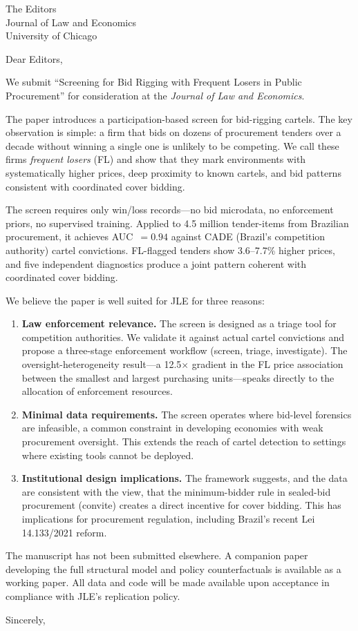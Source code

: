 \documentclass[12pt]{letter}
\date{April 2026}
\begin{document}
\begin{letter}{The Editors\\Journal of Law and Economics\\University of Chicago}

\opening{Dear Editors,}

We submit ``Screening for Bid Rigging with Frequent Losers in Public Procurement'' for consideration at the \textit{Journal of Law and Economics}.

The paper introduces a participation-based screen for bid-rigging cartels. The key observation is simple: a firm that bids on dozens of procurement tenders over a decade without winning a single one is unlikely to be competing. We call these firms \textit{frequent losers} (FL) and show that they mark environments with systematically higher prices, deep proximity to known cartels, and bid patterns consistent with coordinated cover bidding.

The screen requires only win/loss records---no bid microdata, no enforcement priors, no supervised training. Applied to 4.5 million tender-items from Brazilian procurement, it achieves AUC~$= 0.94$ against CADE (Brazil's competition authority) cartel convictions. FL-flagged tenders show 3.6--7.7\% higher prices, and five independent diagnostics produce a joint pattern coherent with coordinated cover bidding.

We believe the paper is well suited for JLE for three reasons:

\begin{enumerate}
\item \textbf{Law enforcement relevance.} The screen is designed as a triage tool for competition authorities. We validate it against actual cartel convictions and propose a three-stage enforcement workflow (screen, triage, investigate). The oversight-heterogeneity result---a 12.5$\times$ gradient in the FL price association between the smallest and largest purchasing units---speaks directly to the allocation of enforcement resources.

\item \textbf{Minimal data requirements.} The screen operates where bid-level forensics are infeasible, a common constraint in developing economies with weak procurement oversight. This extends the reach of cartel detection to settings where existing tools cannot be deployed.

\item \textbf{Institutional design implications.} The framework suggests, and the data are consistent with the view, that the minimum-bidder rule in sealed-bid procurement (convite) creates a direct incentive for cover bidding. This has implications for procurement regulation, including Brazil's recent Lei 14.133/2021 reform.
\end{enumerate}

The manuscript has not been submitted elsewhere. A companion paper developing the full structural model and policy counterfactuals is available as a working paper. All data and code will be made available upon acceptance in compliance with JLE's replication policy.

\closing{Sincerely,}

\end{letter}
\end{document}
